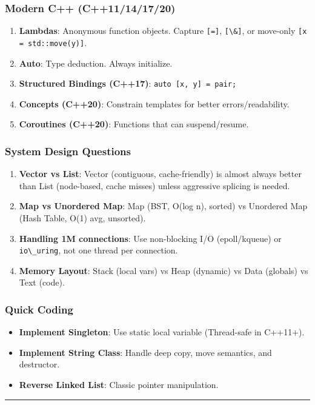 \hypertarget{modern-c-c11141720}{%
\subsubsection{Modern C++ (C++11/14/17/20)}\label{modern-c-c11141720}}

\begin{enumerate}
\def\labelenumi{\arabic{enumi}.}
\tightlist
\item
  \textbf{Lambdas}: Anonymous function objects. Capture
  \passthrough{\lstinline![=]!}, \passthrough{\lstinline![\&]!}, or
  move-only \passthrough{\lstinline![x = std::move(y)]!}.
\item
  \textbf{Auto}: Type deduction. Always initialize.
\item
  \textbf{Structured Bindings (C++17)}:
  \passthrough{\lstinline!auto [x, y] = pair;!}
\item
  \textbf{Concepts (C++20)}: Constrain templates for better
  errors/readability.
\item
  \textbf{Coroutines (C++20)}: Functions that can suspend/resume.
\end{enumerate}

\hypertarget{system-design-questions}{%
\subsubsection{System Design Questions}\label{system-design-questions}}

\begin{enumerate}
\def\labelenumi{\arabic{enumi}.}
\tightlist
\item
  \textbf{Vector vs List}: Vector (contiguous, cache-friendly) is almost
  always better than List (node-based, cache misses) unless aggressive
  splicing is needed.
\item
  \textbf{Map vs Unordered Map}: Map (BST, O(log n), sorted) vs
  Unordered Map (Hash Table, O(1) avg, unsorted).
\item
  \textbf{Handling 1M connections}: Use non-blocking I/O (epoll/kqueue)
  or \passthrough{\lstinline!io\_uring!}, not one thread per connection.
\item
  \textbf{Memory Layout}: Stack (local vars) vs Heap (dynamic) vs Data
  (globals) vs Text (code).
\end{enumerate}

\hypertarget{quick-coding}{%
\subsubsection{Quick Coding}\label{quick-coding}}

\begin{itemize}
\tightlist
\item
  \textbf{Implement Singleton}: Use static local variable (Thread-safe
  in C++11+).
\item
  \textbf{Implement String Class}: Handle deep copy, move semantics, and
  destructor.
\item
  \textbf{Reverse Linked List}: Classic pointer manipulation.
\end{itemize}

\begin{center}\rule{0.5\linewidth}{0.5pt}\end{center}
